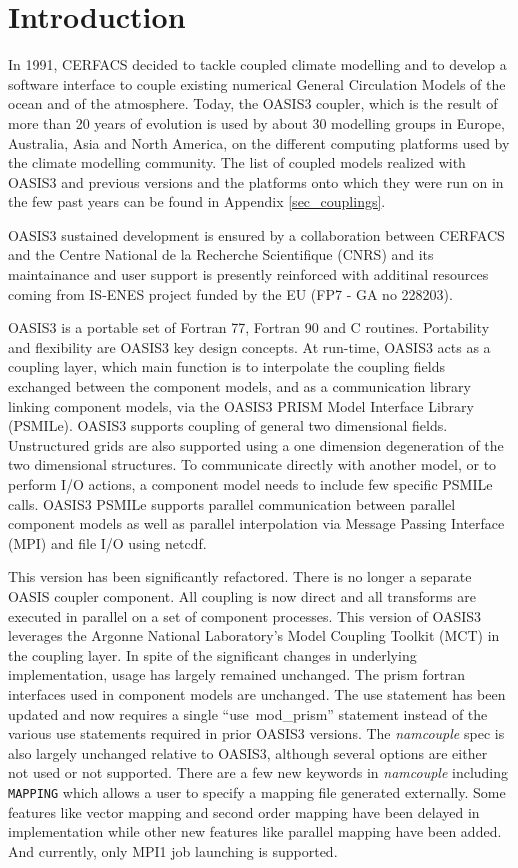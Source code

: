 \newpage
\chapter{Introduction}
\label{sec_step}

In 1991, CERFACS decided to tackle coupled climate modelling and to
develop a software interface to couple existing numerical General
Circulation Models of the ocean and of the atmosphere. Today, the
OASIS3 coupler, which is the result of more than 20 years of evolution
is used by about 30 modelling groups in Europe, Australia, Asia and
North America, on the different computing platforms used by the
climate modelling community. The list of
coupled models realized with OASIS3 and previous versions and the
platforms onto which they were run on in the few past years can be
found in Appendix \ref{sec_couplings}.

OASIS3 sustained development is ensured by a collaboration
between CERFACS and the Centre National de la Recherche Scientifique
(CNRS) and its maintainance and user support is presently reinforced
with additinal resources coming from IS-ENES project funded by the EU (FP7 -
GA no 228203).

OASIS3 is a portable set of Fortran 77, Fortran 90 and C routines.
Portability and flexibility are OASIS3 key design concepts. At
run-time, OASIS3 acts as a coupling layer, which main function is
to interpolate the coupling fields exchanged between the component
models, and as a communication library linking component models, via the OASIS3
PRISM Model Interface Library (PSMILe). OASIS3 supports 
coupling of general two dimensional fields.  Unstructured grids are also supported
using a one dimension degeneration of the two dimensional structures.
To communicate directly with
another model, or to perform I/O actions, a component model needs to
include few specific PSMILe calls. OASIS3 PSMILe supports 
parallel communication between parallel component models
as well as parallel interpolation via Message Passing Interface
(MPI) and file I/O using netcdf.  

This version has been significantly refactored.  There is no
longer a separate OASIS coupler component.  All coupling is now
direct and all transforms are executed in parallel on a set
of component processes.  This version of OASIS3 leverages the
Argonne National Laboratory's Model Coupling Toolkit (MCT)
in the coupling layer.  In spite of the significant changes
in underlying implementation, usage has largely remained unchanged.
The prism fortran interfaces used in component models are unchanged.  The use 
statement has been updated and now requires a single ``use\ mod\_prism''
statement instead of the various use statements required in prior
OASIS3 versions.  The {\it namcouple} spec is also largely unchanged
relative to OASIS3, although several options are either not used
or not supported.  There are a few new keywords in {\it namcouple}
including {\tt MAPPING} which allows a user to specify a mapping
file generated externally.  Some features like vector mapping
and second order mapping have been delayed in implementation
while other new features like parallel mapping have been added.
And currently, only MPI1 job launching is supported.

